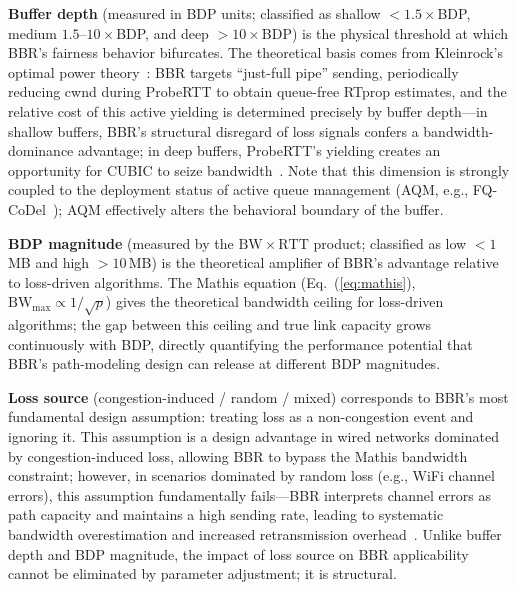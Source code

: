 \documentclass[a4paper,fleqn]{cas-sc}
\begin{document}
\textbf{Buffer depth} (measured in BDP units; classified as shallow
$<1.5\times$BDP, medium $1.5$--$10\times$BDP, and deep $>10\times$BDP) is the
physical threshold at which BBR's fairness behavior bifurcates. The theoretical
basis comes from Kleinrock's optimal power theory~\citep{kleinrock1979power}: BBR
targets ``just-full pipe'' sending, periodically reducing cwnd during ProbeRTT to
obtain queue-free RTprop estimates, and the relative cost of this active
yielding is determined precisely by buffer depth---in shallow buffers, BBR's
structural disregard of loss signals confers a bandwidth-dominance advantage; in
deep buffers, ProbeRTT's yielding creates an opportunity for CUBIC to
seize bandwidth~\citep{appenzeller2004sizing,dhamdhere2006buffer,wischik2005buffers}.
Note that this dimension is strongly coupled to the deployment status of active
queue management (AQM, e.g., FQ-CoDel~\citep{hoeiland2018fq}); AQM effectively
alters the behavioral boundary of the buffer.

\textbf{BDP magnitude} (measured by the $\mathrm{BW}\times\mathrm{RTT}$ product;
classified as low $<1$\,MB and high $>10$\,MB) is the theoretical amplifier of
BBR's advantage relative to loss-driven algorithms. The Mathis equation
(Eq.~(\ref{eq:mathis}), $\mathrm{BW}_{\max}\propto 1/\sqrt{p}$) gives the
theoretical bandwidth ceiling for loss-driven algorithms; the gap between this
ceiling and true link capacity grows continuously with BDP, directly quantifying
the performance potential that BBR's path-modeling design can release at different
BDP magnitudes.

\textbf{Loss source} (congestion-induced / random / mixed) corresponds to BBR's
most fundamental design assumption: treating loss as a non-congestion event and
ignoring it. This assumption is a design advantage in wired networks dominated by
congestion-induced loss, allowing BBR to bypass the Mathis bandwidth constraint;
however, in scenarios dominated by random loss (e.g., WiFi channel errors), this
assumption fundamentally fails---BBR interprets channel errors as path capacity
and maintains a high sending rate, leading to systematic bandwidth overestimation
and increased retransmission overhead~\citep{grazia2020bbrp}. Unlike buffer depth
and BDP magnitude, the impact of loss source on BBR applicability cannot be
eliminated by parameter adjustment; it is structural.
\end{document}

